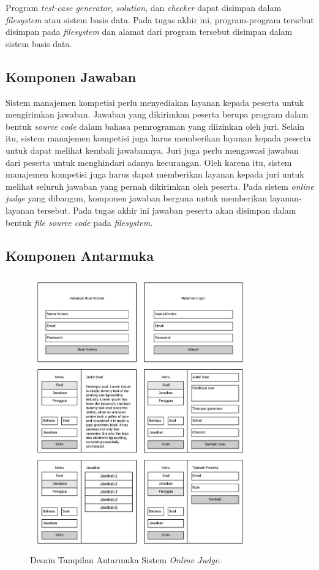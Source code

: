 \par Program \textit{test-case generator}, \textit{solution}, dan \textit{checker} dapat disimpan dalam \textit{filesystem} atau sistem basis data. Pada tugas akhir ini, program-program tersebut disimpan pada \textit{filesystem} dan alamat dari program tersebut disimpan dalam sistem basis data.

\subsection{Komponen Jawaban}

\par Sistem manajemen kompetisi perlu menyediakan layanan kepada peserta untuk mengirimkan jawaban. Jawaban yang dikirimkan peserta berupa program dalam bentuk \textit{source code} dalam bahasa pemrograman yang diizinkan oleh juri. Selain itu, sistem manajemen kompetisi juga harus memberikan layanan kepada peserta untuk dapat melihat kembali jawabannya. Juri juga perlu mengawasi jawaban dari peserta untuk menghindari adanya kecurangan.  Oleh karena itu, sistem manajemen kompetisi juga harus dapat memberikan layanan kepada juri untuk melihat seluruh jawaban yang pernah dikirimkan oleh peserta. Pada sistem \textit{online judge} yang dibangun, komponen jawaban berguna untuk memberikan layanan-layanan tersebut. Pada tugas akhir ini jawaban peserta akan disimpan dalam bentuk \textit{file source code} pada \textit{filesystem}.

\subsection{Komponen Antarmuka}

\begin{figure}[ht!]
    \centering
    \includegraphics[width=0.85\textwidth]{images/mockup}
    \caption{Desain Tampilan Antarmuka Sistem \textit{Online Judge}.}
    \label{fig:mockup}
\end{figure}

